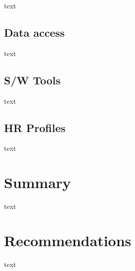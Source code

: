 \documentclass[10pt]{article} %
\begin{document}
text

\subsection{Data access}

text

\subsection{S/W Tools}

text

\subsection{HR Profiles}

text


\section{Summary}

text

\section{Recommendations}

text
\end{document}

